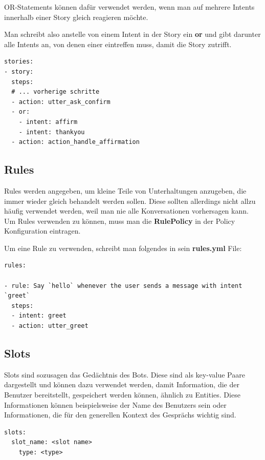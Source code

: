 OR-Statements können dafür verwendet werden, wenn man auf mehrere Intents innerhalb einer Story gleich reagieren möchte.
\cite{orStatements}

Man schreibt also anstelle von einem Intent in der Story ein \textbf{or} und gibt darunter alle Intents an, von denen einer eintreffen muss, damit die Story zutrifft.

\begin{lstlisting}[label={lst: OR Example}]
stories:
- story:
  steps:
  # ... vorherige schritte
  - action: utter_ask_confirm
  - or:
    - intent: affirm
    - intent: thankyou
  - action: action_handle_affirmation
\end{lstlisting}

\subsection{Rules}

Rules werden angegeben, um kleine Teile von Unterhaltungen anzugeben, die immer wieder gleich behandelt werden sollen.
Diese sollten allerdings nicht allzu häufig verwendet werden, weil man nie alle Konversationen vorhersagen kann.
Um Rules verwenden zu können, muss man die \textbf{RulePolicy} in der Policy Konfiguration eintragen.
\cite{rules}

Um eine Rule zu verwenden, schreibt man folgendes in sein \textbf{rules.yml} File:

\begin{lstlisting}[label={lst: Rules Example}]
rules:

- rule: Say `hello` whenever the user sends a message with intent `greet`
  steps:
  - intent: greet
  - action: utter_greet
\end{lstlisting}



\subsection{Slots}

Slots sind sozusagen das Gedächtnis des Bots.
Diese sind als key-value Paare dargestellt und können dazu verwendet werden, damit Information, die der Benutzer bereitstellt, gespeichert werden können, ähnlich zu Entities.
Diese Informationen können beispielsweise der Name des Benutzers sein oder Informationen, die für den generellen Kontext des Gesprächs wichtig sind.
\cite{slots}

\begin{lstlisting}[label={lst: Slot Example}]
slots:
  slot_name: <slot name>
    type: <type>
\end{lstlisting}


